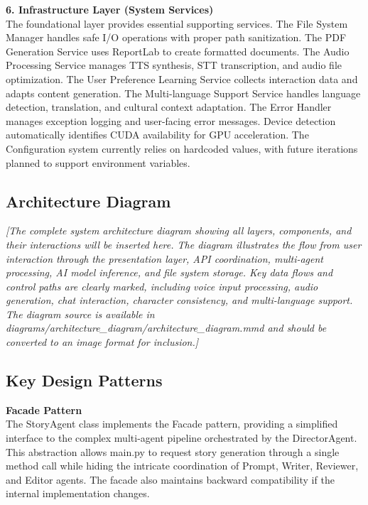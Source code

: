 \textbf{6. Infrastructure Layer (System Services)}\\
The foundational layer provides essential supporting services. The File System Manager handles safe I/O operations with proper path sanitization. The PDF Generation Service uses ReportLab to create formatted documents. The Audio Processing Service manages TTS synthesis, STT transcription, and audio file optimization. The User Preference Learning Service collects interaction data and adapts content generation. The Multi-language Support Service handles language detection, translation, and cultural context adaptation. The Error Handler manages exception logging and user-facing error messages. Device detection automatically identifies CUDA availability for GPU acceleration. The Configuration system currently relies on hardcoded values, with future iterations planned to support environment variables.

\subsection{Architecture Diagram}

\vspace{1cm}
\begin{center}
\textit{[The complete system architecture diagram showing all layers, components, and their interactions will be inserted here. The diagram illustrates the flow from user interaction through the presentation layer, API coordination, multi-agent processing, AI model inference, and file system storage. Key data flows and control paths are clearly marked, including voice input processing, audio generation, chat interaction, character consistency, and multi-language support. The diagram source is available in diagrams/architecture\_diagram/architecture\_diagram.mmd and should be converted to an image format for inclusion.]}
\end{center}
\vspace{1cm}

\subsection{Key Design Patterns}

\textbf{Facade Pattern}\\
The StoryAgent class implements the Facade pattern, providing a simplified interface to the complex multi-agent pipeline orchestrated by the DirectorAgent. This abstraction allows main.py to request story generation through a single method call while hiding the intricate coordination of Prompt, Writer, Reviewer, and Editor agents. The facade also maintains backward compatibility if the internal implementation changes.

